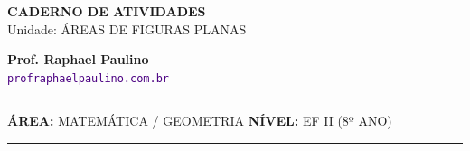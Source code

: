 \documentclass[twoside, 10pt, a4paper]{article}
\begin{document}
\thispagestyle{empty}
\color{Cinzablack}
\vspace*{-1.8cm}

\noindent
\begin{minipage}{\textwidth}
    \selectfont
    \noindent
    \begin{minipage}[t]{0.70\linewidth}
        {\Large \bfseries \MakeUppercase{Caderno de Atividades}}\\[0.1cm]
        {\large \textmd{\textcolor{CinzaEscuro}{Unidade: ÁREAS DE FIGURAS PLANAS}}}
    \end{minipage}%
    \begin{minipage}[t]{0.30\linewidth}
        \raggedleft
        \small \textbf{Prof. Raphael Paulino}\\
        \textsf{\small \textcolor{indigo}{\texttt{profraphaelpaulino.com.br}}}
    \end{minipage}
    
    \vspace{0.15cm}
    \noindent\rule{\linewidth}{1.2pt}
    \vspace{-0.1cm}
    \footnotesize\textsf{\textbf{ÁREA:} MATEMÁTICA / GEOMETRIA \hfill \textbf{NÍVEL:} EF II (8º ANO)}
    \vspace{0.1cm}
    \noindent\rule{\linewidth}{0.4pt}
\end{minipage}
\end{document}
